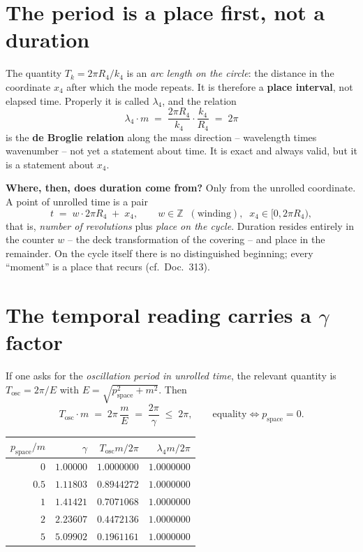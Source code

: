 \documentclass[11pt]{report}
\begin{document}
\section{The period is a place first, not a duration}

The quantity $T_k = 2\pi R_4/k_4$ is an \emph{arc length on the
circle}: the distance in the coordinate $x_4$ after which the mode
repeats. It is therefore a \textbf{place interval}, not elapsed
time. Properly it is called $\lambda_4$, and the relation
\begin{equation}
  \lambda_4 \cdot m \;=\; \frac{2\pi R_4}{k_4}\cdot\frac{k_4}{R_4}
  \;=\; 2\pi
\end{equation}
is the \textbf{de Broglie relation} along the mass direction --
wavelength times wavenumber -- not yet a statement about time. It
is exact and always valid, but it is a statement about $x_4$.

\textbf{Where, then, does duration come from?} Only from the
unrolled coordinate. A point of unrolled time is a pair
\begin{equation}
  t \;=\; w\cdot 2\pi R_4 \;+\; x_4,
  \qquad w \in \mathbb{Z} \;\;(\text{winding}),\;\;
  x_4 \in [0, 2\pi R_4),
\end{equation}
that is, \emph{number of revolutions} plus \emph{place on the
cycle}. Duration resides entirely in the counter $w$ -- the deck
transformation of the covering -- and place in the remainder. On
the cycle itself there is no distinguished beginning; every
\enquote{moment} is a place that recurs (cf.\ Doc.~313).

\section{The temporal reading carries a \texorpdfstring{$\gamma$}{gamma} factor}

If one asks for the \emph{oscillation period in unrolled time},
the relevant quantity is $T_\text{osc} = 2\pi/E$ with
$E = \sqrt{p_\text{space}^2 + m^2}$. Then
\begin{equation}
  T_\text{osc}\cdot m \;=\; 2\pi\,\frac{m}{E}
  \;=\; \frac{2\pi}{\gamma}
  \;\le\; 2\pi,
  \qquad\text{equality} \iff p_\text{space} = 0 .
\end{equation}

\begin{center}
\begin{tabular}{rrrr}
\toprule
$p_\text{space}/m$ & $\gamma$ & $T_\text{osc}m/2\pi$ &
  $\lambda_4 m/2\pi$ \\
\midrule
$0$   & $1.00000$ & $1.0000000$ & $1.0000000$ \\
$0.5$ & $1.11803$ & $0.8944272$ & $1.0000000$ \\
$1$   & $1.41421$ & $0.7071068$ & $1.0000000$ \\
$2$   & $2.23607$ & $0.4472136$ & $1.0000000$ \\
$5$   & $5.09902$ & $0.1961161$ & $1.0000000$ \\
\bottomrule
\end{tabular}
\end{center}
\end{document}
